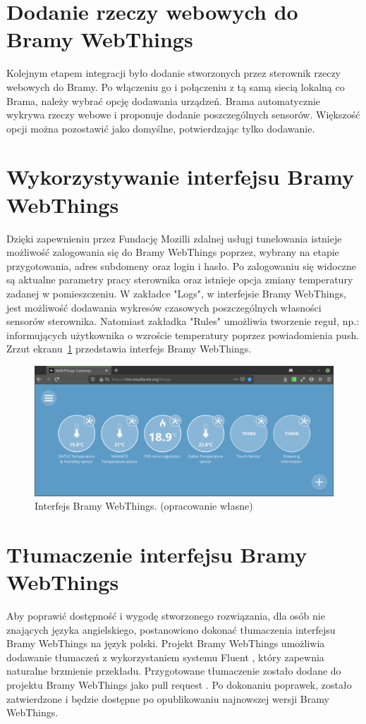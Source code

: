 \documentclass[11pt]{report}
\begin{document}
 \section{Dodanie rzeczy webowych do Bramy WebThings}
 Kolejnym etapem integracji było dodanie stworzonych przez sterownik rzeczy webowych do Bramy. Po włączeniu go i połączeniu z tą samą siecią lokalną co Brama, należy wybrać opcję dodawania urządzeń. Brama automatycznie wykrywa rzeczy webowe i proponuje dodanie poszczególnych sensorów. Większość opcji można pozostawić jako domyślne, potwierdzając tylko dodawanie.
 
 \section{Wykorzystywanie interfejsu Bramy WebThings}
 Dzięki zapewnieniu przez Fundację Mozilli zdalnej usługi tunelowania istnieje możliwość zalogowania się do Bramy WebThings poprzez, wybrany na etapie przygotowania, adres subdomeny oraz login i hasło. Po zalogowaniu się widoczne są aktualne parametry pracy sterownika oraz istnieje opcja zmiany temperatury zadanej w pomieszczeniu. W zakładce "Logs", w interfejsie Bramy WebThings, jest możliwość dodawania wykresów czasowych poszczególnych własności sensorów sterownika. Natomiast zakładka "Rules" umożliwia tworzenie reguł, np.: informujących użytkownika o wzroście temperatury poprzez powiadomienia push.
  Zrzut ekranu~\ref{fig:gateway} przedstawia interfejs Bramy WebThings.
\begin{figure}[ht]
\centering
\includegraphics[width=0.8 \textwidth]{fig/gateway.png}
\caption{Interfejs Bramy WebThings. (opracowanie własne)}
\label{fig:gateway}
\end{figure}
 
 \section{Tłumaczenie interfejsu Bramy WebThings}
 Aby poprawić dostępność i wygodę stworzonego rozwiązania, dla osób nie znających języka angielskiego, postanowiono dokonać tłumaczenia interfejsu Bramy WebThings na język polski. Projekt Bramy WebThings umożliwia dodawanie tłumaczeń z wykorzystaniem systemu Fluent \cite{fluent2020}, który zapewnia naturalne brzmienie przekładu. Przygotowane tłumaczenie zostało dodane do projektu Bramy WebThings jako pull request \cite{gatewaypl2019}. Po dokonaniu poprawek, zostało zatwierdzone i będzie dostępne po opublikowaniu najnowszej wersji Bramy WebThings.
 
\end{document}
